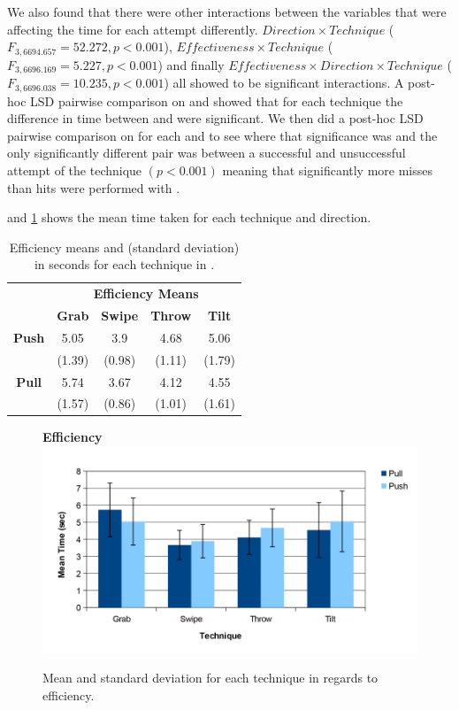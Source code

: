 We also found that there were other interactions between the variables that were affecting the time for each attempt differently. 
$Direction \times Technique$  ($F_{3,6694.657} = 52.272, p < 0.001$), $Effectiveness \times Technique$  ($F_{3,6696.169} = 5.227, p < 0.001$) and finally $Effectiveness \times Direction \times Technique$  ($F_{3,6696.038} = 10.235, p < 0.001$) all showed to be significant interactions. 
A post-hoc LSD pairwise comparison on \direction and \technique showed that for each technique the difference in time between \push and \pull were significant.
We then did a post-hoc LSD pairwise comparison on \effectiveness for each \technique and \direction to see where that significance was and the only significantly different pair was between a successful and unsuccessful attempt of the \grab \pull technique $(p < 0.001)$ meaning that significantly more misses than hits were performed with \grab \pull.

 and \cref{fig:efficiencyGraph} shows the mean time taken for each technique and direction.

\begin{table}[H]
	\centering
	\def\arraystretch{1}
		\begin{tabular}{c c c c c}
			& \multicolumn{4}{c}{\textbf{Efficiency Means}} \B \\
			\cline{2-5}
			& \textbf{Grab} & \textbf{Swipe} & \textbf{Throw} & \textbf{Tilt} \T\B \\ \hline
			\textbf{Push} & 5.05 & 3.9 & 4.68 & 5.06 \T \\ 
			& (1.39) & (0.98) & (1.11) & (1.79) \B \\ \hline
			\textbf{Pull} & 5.74 & 3.67 & 4.12 & 4.55 \T \\ 
			& (1.57) & (0.86) & (1.01) & (1.61) \B \\ \hline
		\end{tabular}
	\caption{Efficiency means and (standard deviation) in seconds for each technique in \target.}
	\label{tab:efficiency}
\end{table}

\begin{figure}[H]{
	\centering
	\textbf{Efficiency}\\[4pt]
	\includegraphics[width = 1\columnwidth ]{images/time_graph.pdf}} 
	\caption{
		Mean and standard deviation for each technique in regards to efficiency.
	}
	\label{fig:efficiencyGraph}
\end{figure}

